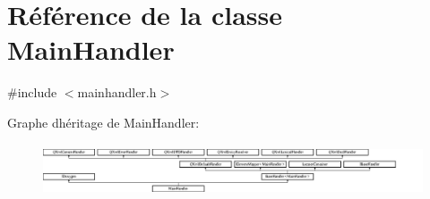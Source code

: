 \hypertarget{class_main_handler}{}\section{Référence de la classe Main\+Handler}
\label{class_main_handler}


{\ttfamily \#include $<$mainhandler.\+h$>$}

Graphe d\textquotesingle{}héritage de Main\+Handler\+:\begin{figure}[H]
\begin{center}
\leavevmode
\includegraphics[height=1.560976cm]{class_main_handler}
\end{center}
\end{figure}
